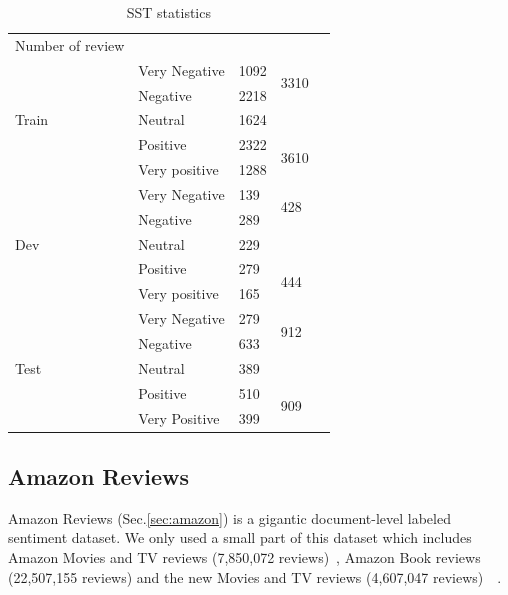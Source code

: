 \begin{table}[H]
    \centering
    \caption{SST statistics}
    \label{table:sststatistic_5}
    \begin{tabular}{lllll}
        Number of review       &               &      &                       &  \\ \cline{1-4}
        \multirow{5}{*}{Train} & Very Negative & 1092 & \multirow{2}{*}{3310} &  \\ \cline{2-3}
        & Negative      & 2218 &                       &  \\ \cline{2-4}
        & Neutral       & 1624 &                       &  \\ \cline{2-4}
        & Positive      & 2322 & \multirow{2}{*}{3610} &  \\ \cline{2-3}
        & Very positive & 1288 &                       &  \\ \cline{1-4}
        \multirow{5}{*}{Dev}   & Very Negative & 139  & \multirow{2}{*}{428}  &  \\ \cline{2-3}
        & Negative      & 289  &                       &  \\ \cline{2-4}
        & Neutral       & 229  &                       &  \\ \cline{2-4}
        & Positive      & 279  & \multirow{2}{*}{444}  &  \\ \cline{2-3}
        & Very positive & 165  &                       &  \\ \cline{1-4}
        \multirow{5}{*}{Test}  & Very Negative & 279  & \multirow{2}{*}{912}  &  \\ \cline{2-3}
        & Negative      & 633  &                       &  \\ \cline{2-4}
        & Neutral       & 389  &                       &  \\ \cline{2-4}
        & Positive      & 510  & \multirow{2}{*}{909}  &  \\ \cline{2-3}
        & Very Positive & 399  &                       &  \\ \cline{2-4}
    \end{tabular}
\end{table}
\subsection{Amazon Reviews}
Amazon Reviews (Sec.\ref{sec:amazon}) is a gigantic document-level labeled sentiment dataset.
We only used a small part of this dataset which includes Amazon Movies and TV reviews (7,850,072 reviews)~\cite{mcauley2013hidden}, Amazon Book reviews (22,507,155 reviews) and the new Movies and TV reviews (4,607,047 reviews)~\cite{McAuleyTSH15}~\cite{HeM16}.

